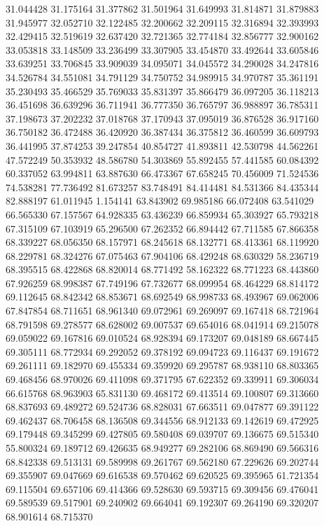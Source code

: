 31.044428
31.175164
31.377862
31.501964
31.649993
31.814871
31.879883
31.945977
32.052710
32.122485
32.200662
32.209115
32.316894
32.393993
32.429415
32.519619
32.637420
32.721365
32.774184
32.856777
32.900162
33.053818
33.148509
33.236499
33.307905
33.454870
33.492644
33.605846
33.639251
33.706845
33.909039
34.095071
34.045572
34.290028
34.247816
34.526784
34.551081
34.791129
34.750752
34.989915
34.970787
35.361191
35.230493
35.466529
35.769033
35.831397
35.866479
36.097205
36.118213
36.451698
36.639296
36.711941
36.777350
36.765797
36.988897
36.785311
37.198673
37.202232
37.018768
37.170943
37.095019
36.876528
36.917160
36.750182
36.472488
36.420920
36.387434
36.375812
36.460599
36.609793
36.441995
37.874253
39.247854
40.854727
41.893811
42.530798
44.562261
47.572249
50.353932
48.586780
54.303869
55.892455
57.441585
60.084392
60.337052
63.994811
63.887630
66.473367
67.658245
70.456009
71.524536
74.538281
77.736492
81.673257
83.748491
84.414481
84.531366
84.435344
82.888197
61.011945
1.154141
63.843902
69.985186
66.072408
63.541029
66.565330
67.157567
64.928335
63.436239
66.859934
65.303927
65.793218
67.315109
67.103919
65.296500
67.262352
66.894442
67.711585
67.866358
68.339227
68.056350
68.157971
68.245618
68.132771
68.413361
68.119920
68.229781
68.324276
67.075463
67.904106
68.429248
68.630329
58.236719
68.395515
68.422868
68.820014
68.771492
58.162322
68.771223
68.443860
67.926259
68.998387
67.749196
67.732677
68.099954
68.464229
68.814172
69.112645
68.842342
68.853671
68.692549
68.998733
68.493967
69.062006
67.847854
68.711651
68.961340
69.072961
69.269097
69.167418
68.721964
68.791598
69.278577
68.628002
69.007537
69.654016
68.041914
69.215078
69.059022
69.167816
69.010524
68.928394
69.173207
69.048189
68.667445
69.305111
68.772934
69.292052
69.378192
69.094723
69.116437
69.191672
69.261111
69.182970
69.455334
69.359920
69.295787
68.938110
68.803365
69.468456
68.970026
69.411098
69.371795
67.622352
69.339911
69.306034
66.615768
68.963903
65.831130
69.468172
69.413514
69.100807
69.313660
68.837693
69.489272
69.524736
68.828031
67.663511
69.047877
69.391122
69.462437
68.706458
68.136508
69.344556
68.912133
69.142619
69.472925
69.179448
69.345299
69.427805
69.580408
69.039707
69.136675
69.515340
55.800324
69.189712
69.426635
68.949277
69.282106
68.869490
69.566316
68.842338
69.513131
69.589998
69.261767
69.562180
67.229626
69.202744
69.355907
69.047669
69.616538
69.570462
69.620525
69.395965
61.721354
69.115504
69.657106
69.414366
69.528630
69.593715
69.309456
69.476041
69.589539
69.517901
69.240902
69.664041
69.192307
69.264190
69.320207
68.901614
68.715370
